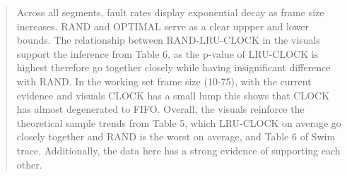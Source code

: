 \documentclass[a4paper, 11pt]{report}
\begin{document}
    \begin{flushright}
        \vspace{0.5cm}
        \begin{minipage}[t]{0.5\linewidth}
            \begin{quote}
                Across all segments, fault rates display exponential decay as frame size increases. RAND and OPTIMAL serve as a clear uppper and lower bounds.
                The relationship between RAND-LRU-CLOCK in the visuals support the inference from Table 6, as the p-value of LRU-CLOCK is highest therefore 
                go together closely while having insignificant difference with RAND. In the working set frame size (10-75), with the current evidence and visuals
                CLOCK has a small lump this shows that CLOCK has almost degenerated to FIFO\cite{cornelluni}. Overall, the visuals reinforce the theoretical 
                sample trends from Table 5, which LRU-CLOCK on average go closely together and RAND is the worst on average, and Table 6 of Swim trace.
                Additionally, the data here has a strong evidence of supporting each other.
            \end{quote}
        \end{minipage}
    \end{flushright}
    \begin{figure}[H]
        
    \end{figure}
\newpage
\end{document}
